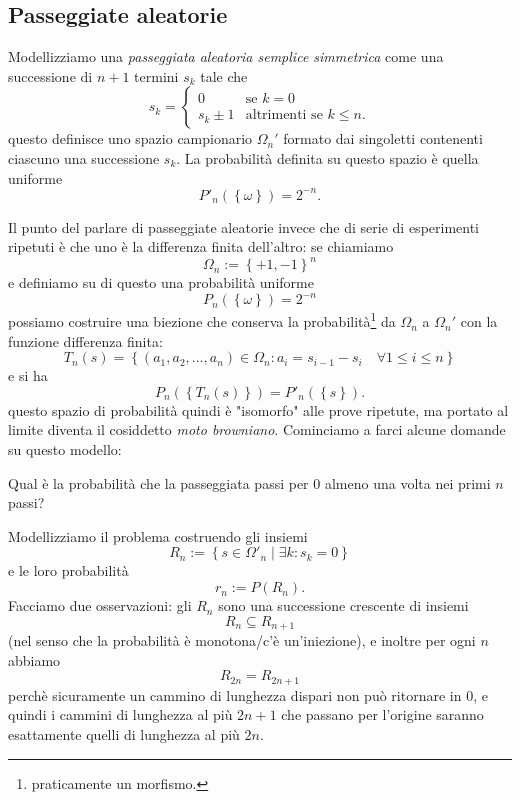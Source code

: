 \documentclass[11pt]{scrartcl}
\begin{document}
	\subsection{Passeggiate aleatorie}
	
	\begin{definition}
		Modellizziamo una \textit{passeggiata aleatoria semplice simmetrica} come una successione di $n+1$ termini $s_k$ tale che 
		$$s_k=\begin{cases}
			0 & \text{se $k=0$} \\
			s_{k}\pm 1 & \text{altrimenti se $k\le n$.}
		\end{cases}$$
		questo definisce uno spazio campionario $\Omega_n'$ formato dai singoletti contenenti ciascuno una successione $s_k$. La probabilità definita su questo spazio è quella uniforme
		$$P'_n(\left\{\omega\right\})=2^{-n}.$$
	\end{definition}
	Il punto del parlare di passeggiate aleatorie invece che di serie di esperimenti ripetuti è che uno è la differenza finita dell'altro: se chiamiamo 
	$$\Omega_n:=\left\{+1,-1\right\}^n$$
	e definiamo su di questo una probabilità uniforme
	$$P_n(\left\{\omega\right\})=2^{-n}$$
	possiamo costruire una biezione che conserva la probabilità\footnote{praticamente un morfismo.} da $\Omega_n$ a $\Omega_n'$ con la funzione differenza finita:
	$$T_n(s)=\left\{(a_1,a_2,\dots,a_n)\in \Omega_n:a_i=s_{i-1}-s_i \quad \forall 1\le i \le n\right\}$$
	e si ha 
	$$P_n(\left\{T_n(s)\right\})=P'_n(\left\{s\right\}).$$
	questo spazio di probabilità quindi è "isomorfo" alle prove ripetute, ma portato al limite diventa il cosiddetto \textit{moto browniano}. Cominciamo a farci alcune domande su questo modello:
	\begin{problem}
		Qual è la probabilità che la passeggiata passi per $0$ almeno una volta nei primi $n$ passi?
	\end{problem}
	Modellizziamo il problema costruendo gli insiemi 
	$$R_n:=\left\{s\in \Omega'_n\mid \exists k : s_k=0\right\}$$
	e le loro probabilità
	$$r_n:=P(R_n).$$
	Facciamo due osservazioni: gli $R_n$ sono una successione crescente di insiemi
	$$R_n\subseteq R_{n+1}$$
	(nel senso che la probabilità è monotona/c'è un'iniezione), e inoltre per ogni $n$ abbiamo
	$$R_{2n}=R_{2n+1}$$
	perchè sicuramente un cammino di lunghezza dispari non può ritornare in $0$, e quindi i cammini di lunghezza al più $2n+1$ che passano per l'origine saranno esattamente quelli di lunghezza al più $2n$. \\
\end{document}
